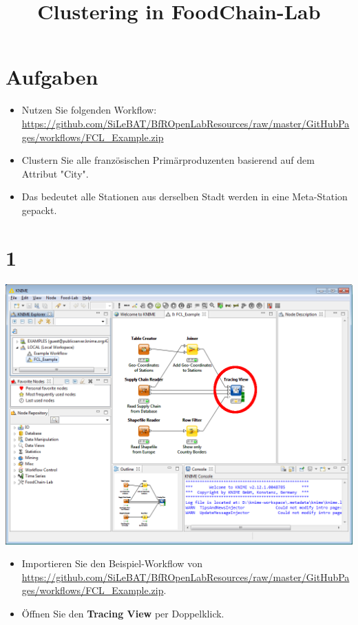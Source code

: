 \documentclass{beamer}
\title{Clustering in FoodChain-Lab}
\date{}
\begin{document}
\maketitle

\section{Aufgaben}
\begin{frame}
	\begin{itemize}
		\item Nutzen Sie folgenden Workflow: \url{https://github.com/SiLeBAT/BfROpenLabResources/raw/master/GitHubPages/workflows/FCL_Example.zip}
		\item Clustern Sie alle französischen Primärproduzenten basierend auf dem Attribut "City".
		\item Das bedeutet alle Stationen aus derselben Stadt werden in eine Meta-Station gepackt.
	\end{itemize}
\end{frame}
 
\section{1}
\begin{frame}
	\begin{center}
  		\includegraphics[height=0.6\textheight]{1.png}
	\end{center}
	\begin{itemize}
		\item Importieren Sie den Beispiel-Workflow von \url{https://github.com/SiLeBAT/BfROpenLabResources/raw/master/GitHubPages/workflows/FCL_Example.zip}.
		\item Öffnen Sie den \textbf{Tracing View} per Doppelklick.
	\end{itemize}
\end{frame}
\end{document}
